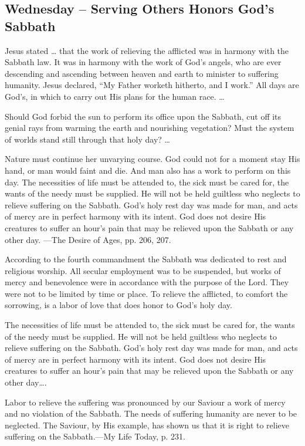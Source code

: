 \documentclass[a4paper, 10pt, twoside, headings=small]{scrartcl}
\begin{document}
\begin{multicols}{2}
\section*{Wednesday – Serving Others Honors God’s Sabbath}

Jesus stated … that the work of relieving the afflicted was in harmony with the Sabbath law. It was in harmony with the work of God’s angels, who are ever descending and ascending between heaven and earth to minister to suffering humanity. Jesus declared, “My Father worketh hitherto, and I work.” All days are God’s, in which to carry out His plans for the human race. …

Should God forbid the sun to perform its office upon the Sabbath, cut off its genial rays from warming the earth and nourishing vegetation? Must the system of worlds stand still through that holy day? …

Nature must continue her unvarying course. God could not for a moment stay His hand, or man would faint and die. And man also has a work to perform on this day. The necessities of life must be attended to, the sick must be cared for, the wants of the needy must be supplied. He will not be held guiltless who neglects to relieve suffering on the Sabbath. God’s holy rest day was made for man, and acts of mercy are in perfect harmony with its intent. God does not desire His creatures to suffer an hour’s pain that may be relieved upon the Sabbath or any other day. —The Desire of Ages, pp. 206, 207.

According to the fourth commandment the Sabbath was dedicated to rest and religious worship. All secular employment was to be suspended, but works of mercy and benevolence were in accordance with the purpose of the Lord. They were not to be limited by time or place. To relieve the afflicted, to comfort the sorrowing, is a labor of love that does honor to God’s holy day.

The necessities of life must be attended to, the sick must be cared for, the wants of the needy must be supplied. He will not be held guiltless who neglects to relieve suffering on the Sabbath. God’s holy rest day was made for man, and acts of mercy are in perfect harmony with its intent. God does not desire His creatures to suffer an hour’s pain that may be relieved upon the Sabbath or any other day….

Labor to relieve the suffering was pronounced by our Saviour a work of mercy and no violation of the Sabbath. The needs of suffering humanity are never to be neglected. The Saviour, by His example, has shown us that it is right to relieve suffering on the Sabbath.—My Life Today, p. 231.


\end{multicols}
\end{document}

